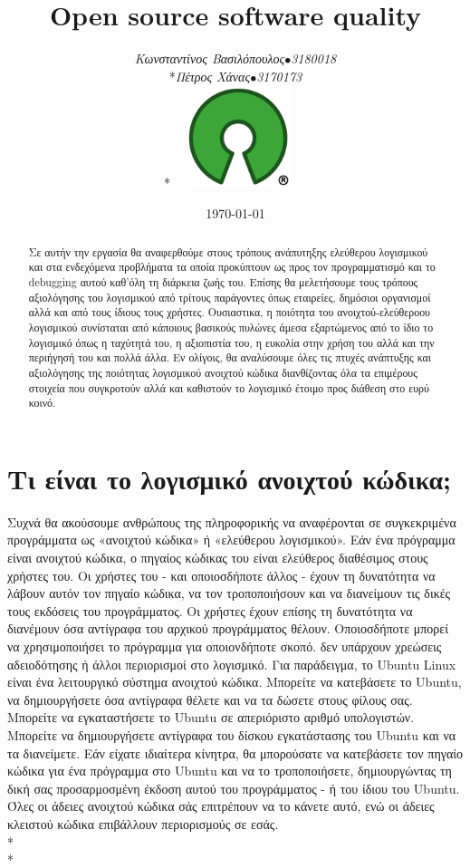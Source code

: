\documentclass{article}
\title{\textbf{\textlatin{Open source software quality}}}
\author{{\textit{Κωνσταντίνος Βασιλόπουλος\(\bullet\)3180018}\\*\textit{Πέτρος Χάνας\(\bullet\)3170173}}\\*\includegraphics[width=4cm, height=3cm]{oSource}}
\date{\today}
\begin{document}
\maketitle

{\selectfont
\begin{abstract}
Σε αυτήν την εργασία θα αναφερθούμε στους τρόπους ανάπυτηξης ελεύθερου λογισμικού
και στα ενδεχόμενα προβλήματα τα οποία προκύπτουν ως προς τον προγραμματισμό και το 
\textlatin{debugging} αυτού καθ'όλη τη διάρκεια ζωής του. Επίσης θα μελετήσουμε τους 
τρόπους αξιολόγησης του λογισμικού από τρίτους παράγοντες όπως εταιρείες, δημόσιοι οργανισμοί 
αλλά και από τους ίδιους τους χρήστες. Ουσιαστικα, η ποιότητα του ανοιχτού-ελεύθεροου λογισμικού 
συνίσταται από κάποιους βασικούς πυλώνες άμεσα εξαρτώμενος από το ίδιο το λογισμικό όπως η ταχύτητά
του, η αξιοπιστία του, η ευκολία στην χρήση του αλλά και την περιήγησή του και πολλά άλλα. Εν ολίγοις, 
θα αναλύσουμε όλες τις πτυχές ανάπτυξης και αξιολόγησης της ποιότητας λογισμικού ανοιχτού κώδικα 
διανθίζοντας όλα τα επιμέρους στοιχεία που συγκροτούν αλλά και καθιστούν το λογισμικό έτοιμο προς διάθεση 
στο ευρύ κοινό.
\end{abstract}

{\selectfont\section{Τι είναι το λογισμικό ανοιχτού κώδικα\textlatin{;}}}
 Συχνά θα ακούσουμε ανθρώπους της πληροφορικής να αναφέρονται σε συγκεκριμένα προγράμματα ως «ανοιχτού κώδικα» ή «ελεύθερου λογισμικού». Εάν ένα πρόγραμμα είναι ανοιχτού κώδικα, ο πηγαίος κώδικας του είναι ελεύθερος διαθέσιμος στους χρήστες του. Οι χρήστες του - και οποιοσδήποτε άλλος - έχουν τη δυνατότητα να λάβουν αυτόν τον πηγαίο κώδικα, να τον τροποποιήσουν και να διανείμουν τις δικές τους εκδόσεις του προγράμματος. Οι χρήστες έχουν επίσης τη δυνατότητα να διανέμουν όσα αντίγραφα του αρχικού προγράμματος θέλουν. Οποιοσδήποτε μπορεί να χρησιμοποιήσει το πρόγραμμα για οποιονδήποτε σκοπό. δεν υπάρχουν χρεώσεις αδειοδότησης ή άλλοι περιορισμοί στο λογισμικό. Για παράδειγμα, το \textlatin{Ubuntu Linux} είναι ένα λειτουργικό σύστημα ανοιχτού κώδικα. Μπορείτε να κατεβάσετε το \textlatin{Ubuntu}, να δημιουργήσετε όσα αντίγραφα θέλετε και να τα δώσετε στους φίλους σας. Μπορείτε να εγκαταστήσετε το Ubuntu σε απεριόριστο αριθμό υπολογιστών. Μπορείτε να δημιουργήσετε αντίγραφα του δίσκου εγκατάστασης του \textlatin{Ubuntu} και να τα διανείμετε. Εάν είχατε ιδιαίτερα κίνητρα, θα μπορούσατε να κατεβάσετε τον πηγαίο κώδικα για ένα πρόγραμμα στο Ubuntu και να το τροποποιήσετε, δημιουργώντας τη δική σας προσαρμοσμένη έκδοση αυτού του προγράμματος - ή του ίδιου του \textlatin{Ubuntu}. Όλες οι άδειες ανοιχτού κώδικα σάς επιτρέπουν να το κάνετε αυτό, ενώ οι άδειες κλειστού κώδικα επιβάλλουν περιορισμούς σε εσάς.\\*
\\*
}
\end{document}

